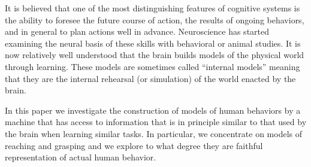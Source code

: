 It is believed that one of the most distinguishing features of cognitive
systems is the ability to foresee the future course of action, the results
of ongoing behaviors, and in general to plan actions well in advance.
Neuroscience has started examining the neural basis of these skills with 
behavioral or animal studies. It is now relatively well understood that
the brain builds models of the physical world through learning. These
models are sometimes called ``internal models'' meaning that they are
the internal rehearsal (or simulation) of the world enacted by the brain.

In this paper we investigate the construction of models of human behaviors
by a machine that has access to information that is in principle similar
to that used by the brain when learning similar tasks. In particular, we
concentrate on models of reaching and grasping and we explore to what degree
they are faithful representation of actual human behavior. 